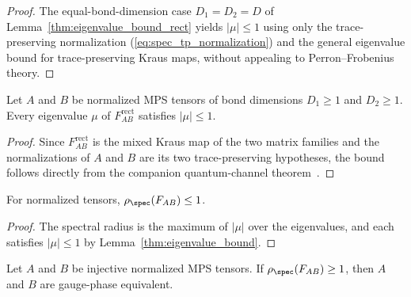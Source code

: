 \begin{proof}
    \leanok
    The equal-bond-dimension case $D_1=D_2=D$ of
    Lemma~\ref{thm:eigenvalue_bound_rect} yields $|\mu|\leq1$ using only the
    trace-preserving normalization (\ref{eq:spec_tp_normalization}) and the
    general eigenvalue bound for trace-preserving Kraus maps, without appealing
    to Perron--Frobenius theory.
\end{proof}

\begin{lemma}\label{thm:eigenvalue_bound_rect}
    \leanok
    Let $A$ and $B$ be normalized MPS tensors of bond dimensions
    $D_1\geq1$ and $D_2\geq1$. Every eigenvalue $\mu$ of
    $F_{AB}^{\mathrm{rect}}$ satisfies $|\mu|\leq1$.
\end{lemma}

\begin{proof}\leanok
    Since $F_{AB}^{\mathrm{rect}}$ is the mixed Kraus map of the two matrix
    families and the normalizations of $A$ and $B$ are its two trace-preserving
    hypotheses, the bound follows directly from the companion quantum-channel
    theorem~\cite[``Eigenvalue bound for a trace-preserving mixed Kraus map'']{QICLean2026Blueprint}.
\end{proof}

\begin{lemma}\label{thm:spectral_radius_le_one}
    \leanok
    For normalized tensors, $\rho_{\spec}(F_{AB})\leq1$.
\end{lemma}

\begin{proof}\leanok
    The spectral radius is the maximum of $|\mu|$ over the eigenvalues, and
    each satisfies $|\mu|\leq1$ by Lemma~\ref{thm:eigenvalue_bound}.
\end{proof}

\begin{theorem}%
    \label{thm:modulus_one_gauge}
    \leanok
    Let $A$ and $B$ be injective normalized MPS tensors. If
    $\rho_{\spec}(F_{AB})\geq1$, then $A$ and $B$ are gauge-phase
    equivalent.
\end{theorem}

